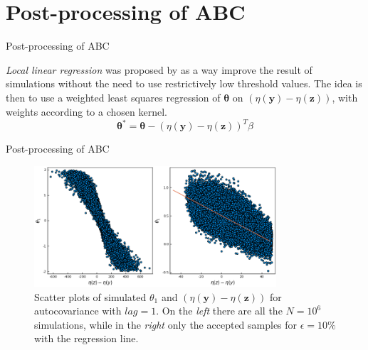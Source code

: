 \documentclass[10pt]{beamer}
\begin{document}
\section[Post-Processing of ABC]{Post-processing of ABC}
\begin{frame}[fragile]{Post-processing of ABC}
  
  \textit{Local linear regression} was proposed by
  \citet{Beaumont2012} as a way improve the result of simulations
  without the need to use restrictively low threshold values.
  The idea is then to use a weighted least squares regression
  of $\bm \theta$ on $(\eta(\bm y) - \eta(\bm z))$, with weights
  according to a chosen kernel.
  $$
  \bm \theta^* = \bm \theta - (\eta(\bm y) - \eta(\bm z))^T\hat\beta
  $$

\end{frame}

\begin{frame}[fragile]{Post-processing of ABC}
  
    \begin{figure}[H]
        \centering
        \includegraphics[width=9cm]{images/RegressionABC1.png}
        \caption{Scatter plots of simulated $\theta_1$ and
        $(\eta(\bm y)-\eta(\bm z))$ for autocovariance with
        $lag = 1$. On the \textit{left} there are all the
        $N=10^6$ simulations, while in the \textit{right} only the
        accepted samples for $\epsilon = 10\%$ with the regression
        line.
        }
    \end{figure}


\end{frame}
\end{document}
